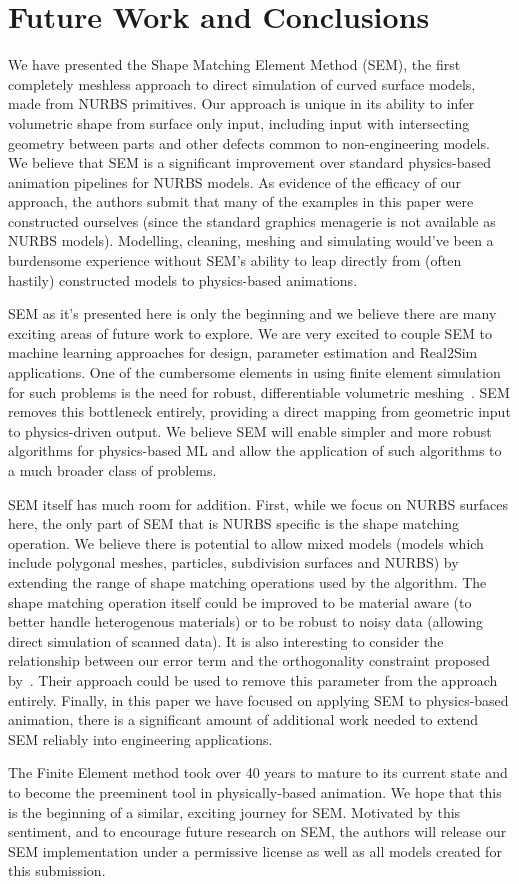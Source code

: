 \section{Future Work and Conclusions}
We have presented the Shape Matching Element Method (SEM), the first completely meshless approach to direct simulation of curved surface models, made from NURBS primitives.
Our approach is unique in its ability to infer volumetric shape from surface only input,
including input with intersecting geometry between parts and other defects common to non-engineering models.
We believe that SEM is a significant improvement over standard physics-based animation pipelines for NURBS models. 
As evidence of the efficacy of our approach, the authors submit that many of the examples in this paper were constructed ourselves
(since the standard graphics menagerie is not available as NURBS models). 
Modelling, cleaning, meshing and simulating would've been a burdensome experience without SEM's
ability to leap directly from (often hastily) constructed models to physics-based animations.

SEM as it's presented here is only the beginning and we believe there are many exciting areas of future work to explore.
We are very excited to couple SEM to machine learning approaches for design, parameter estimation and Real2Sim applications.
One of the cumbersome elements in using finite element simulation for such problems is the need for robust, differentiable volumetric meshing~\cite{gao2020deftet}.
SEM removes this bottleneck entirely, providing a direct mapping from geometric input to physics-driven output. 
We believe SEM will enable simpler and more robust algorithms for  physics-based ML and 
allow the application of such algorithms to a much broader class of problems. 

SEM itself has much room for addition. 
First, while we focus on NURBS surfaces here, the only part of SEM that is NURBS specific is the shape matching operation.
We believe there is potential to allow mixed models (models which include polygonal meshes, particles, subdivision surfaces and NURBS)
by extending the range of shape matching operations used by the algorithm. The shape matching operation itself could be improved to be material aware 
(to better handle heterogenous materials) or to be robust to noisy data (allowing direct simulation of scanned data). 
It is also interesting to consider the relationship between our error term and the orthogonality constraint proposed by~\citet{Zhang:CompDynamics:2020}. 
Their approach could be used to remove this parameter from the approach entirely.
Finally, in this paper we have focused on applying SEM to physics-based animation, there is a significant amount of additional work needed to 
extend SEM reliably into engineering applications.

The Finite Element method took over  40 years to mature to its current state and to become the preeminent tool in physically-based animation.
We hope that this is the beginning of a similar, exciting journey for SEM. 
Motivated by this sentiment, and to encourage future research on SEM, the authors will release our SEM implementation 
under a permissive license as well as all models created for this submission.
